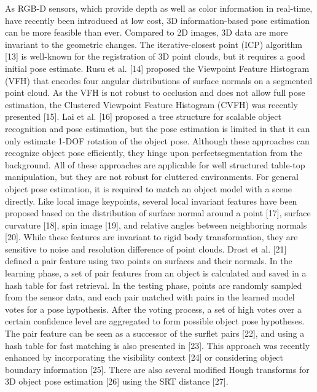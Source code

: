 \documentclass[10]{article}
\begin{document}
As RGB-D sensors, which provide depth as well as color information in real-time, have recently been introduced at low cost, 3D information-based pose estimation can be more feasible than ever. Compared to 2D images, 3D data are more invariant to the geometric changes. The iterative-closest point (ICP) algorithm [13] is well-known for the registration of 3D point clouds, but it requires a good initial pose estimate. Rusu et al. [14] proposed the Viewpoint Feature Histogram (VFH) that encodes four angular distributions of surface normals on a segmented point cloud. As the VFH is not robust to occlusion and does not allow full pose estimation, the Clustered Viewpoint Feature Histogram (CVFH) was recently presented [15]. Lai et al. [16] proposed a tree structure for scalable object recognition and pose estimation, but the pose estimation is limited in that it can only estimate 1-DOF rotation of the object pose. Although these approaches can recognize object pose efficiently, they hinge upon perfectsegmentation from the background. All of these approaches are applicable for well structured table-top manipulation, but they are not robust for cluttered environments. For general object pose estimation, it is required to match an object model with a scene directly. Like local image keypoints, several local invariant features have been proposed based on the distribution of surface normal around a point [17], surface curvature [18], spin image [19], and relative angles between neighboring normals [20]. While these features are invariant to rigid body transformation, they are sensitive to noise and resolution difference of point clouds.
Drost et al. [21] defined a pair feature using two points on surfaces and their normals. In the learning phase, a set of pair features from an object is calculated and saved in a hash table for fast retrieval. In the testing phase, points are randomly sampled from the sensor data, and each pair matched with pairs in the learned model votes for a pose hypothesis. After the voting process, a set of high votes over a certain confidence level are aggregated to form possible object pose hypotheses. The pair feature can be seen as a successor of the surflet pairs [22], and using a hash table for fast matching is also presented in [23]. This approach was recently enhanced by incorporating the visibility context [24] or considering object boundary information [25]. There are
also several modified Hough transforms for 3D object pose estimation [26] using the SRT distance [27]. 
\end{document}
